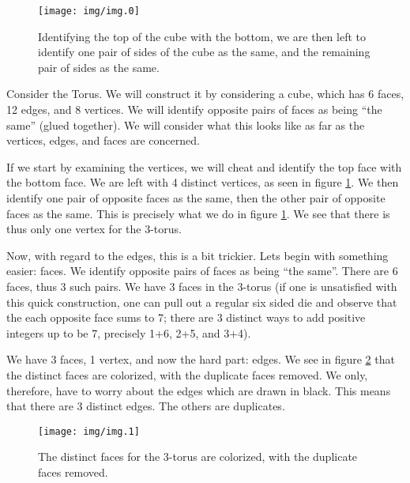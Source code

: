 \begin{figure}[ht]
\begin{center}
\texttt{[image: img/img.0]}
\end{center}
\caption{Identifying the top of the cube with the bottom, we are
  then left to identify one pair of sides of the cube as the
  same, and the remaining pair of sides as the same.}\label{fig:img0}
\end{figure}

Consider the Torus. We will construct it by considering a cube,
which has 6 faces, 12 edges, and 8 vertices. We will identify
opposite pairs of faces as being ``the same'' (glued
together). We will consider what this looks like as far as the
vertices, edges, and faces are concerned.

If we start by examining the vertices, we will cheat and identify
the top face with the bottom face. We are left with 4 distinct
vertices, as seen in figure \ref{fig:img0}. We then identify one
pair of opposite faces as the same, then the other pair of
opposite faces as the same. This is precisely what we do in
figure \ref{fig:img0}. We see that there is thus only one vertex
for the 3-torus.

Now, with regard to the edges, this is a bit trickier. Lets begin
with something easier: faces. We identify opposite pairs of faces
as being ``the same''. There are 6 faces, thus 3 such pairs. We
have 3 faces in the 3-torus (if one is unsatisfied with this
quick construction, one can pull out a regular six sided die and
observe that the each opposite face sums to 7; there are 3
distinct ways to add positive integers up to be 7, precisely 1+6,
2+5, and 3+4).

We have 3 faces, 1 vertex, and now the hard part: edges. We see
in figure \ref{fig:img1} that the distinct faces are colorized,
with the duplicate faces removed. We only, therefore, have to
worry about the edges which are drawn in black. This means that
there are 3 distinct edges. The others are duplicates.

\begin{figure}[ht]
\begin{center}
\texttt{[image: img/img.1]}
\end{center}
\caption{The distinct faces for the 3-torus are colorized, with the duplicate faces removed.}\label{fig:img1}
\end{figure}

